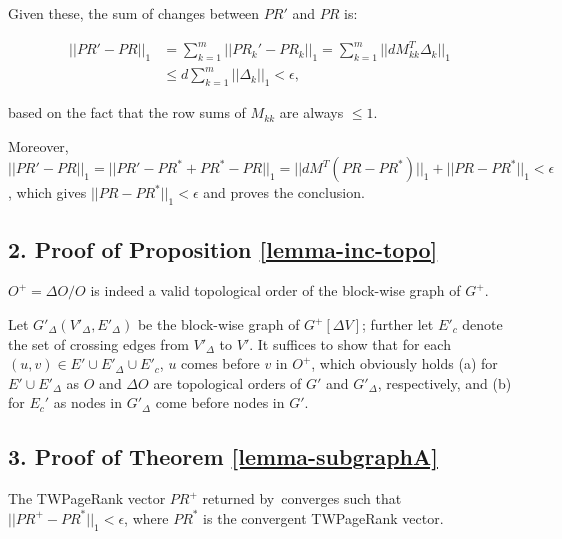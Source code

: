 \begin{proofS}
Given these, the sum of changes between $PR'$ and $PR$ is:

\vspace{-1ex}
\begin{small}
\begin{equation*}
\begin{split}
||PR'-PR||_1 & =\sum_{k=1}^m ||PR_k'-PR_k||_1 = \sum_{k=1}^m ||d M_{kk}^T \Delta_k||_1 \\
& \le d\sum_{k=1}^m ||\Delta_k||_1 < \epsilon,
\end{split}
\end{equation*}
\end{small}
\noindent
based on the fact that the row sums of $M_{kk}$ are always $\le 1$. %

Moreover, $||PR'-PR||_1 = ||PR' - PR^* + PR^* -PR||_1 = ||d M^T (PR-PR^*)||_1 + ||PR-PR^*||_1<\epsilon$, which gives $||PR-PR^*||_1<\epsilon$ and proves the conclusion.
\end{proofS}

\subsection*{2. Proof of Proposition \ref{lemma-inc-topo}}
$O^+=\Delta O/O$ is indeed a valid topological order of the block-wise graph of $G^+$.

\vspace{.5ex}
\begin{proofS}
Let $G'_\Delta(V'_\Delta, E'_\Delta)$ be the block-wise graph of $G^+[\Delta V]$; further let $E'_c$ denote the set of crossing edges from $V'_\Delta$ to $V'$.
It suffices to show that for each $(u,v)\in E'\cup E'_\Delta \cup E'_c$, $u$ comes before $v$ in $O^+$,
which obviously holds (a) for  $E'\cup E'_\Delta$ as $O$ and $\Delta O$ are topological orders of $G'$ and $G'_\Delta$, respectively, and (b) for $E_{c}'$ as nodes in $G'_\Delta$ come before nodes in $G'$.
\end{proofS}



\subsection*{3. Proof of Theorem \ref{lemma-subgraphA}}
The TWPageRank vector $PR^+$ returned by~\inctwprscc converges such that $||PR^+-PR^{*}||_1 < \epsilon$, where $PR^{*}$ is the convergent TWPageRank vector.

